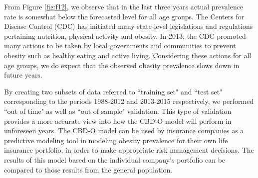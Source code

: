 \documentclass[11pt,letterpaper]{article}
\numberwithin{equation}{section}
\begin{document}
From Figure \ref{fig:f12}, we observe that in the last three years actual prevalence rate is somewhat below the forecasted level for all age groups. The Centers for Disease Control (CDC) has initiated many state-level legislations and regulations pertaining nutrition, physical activity and obesity. In 2013, the CDC promoted many actions to be taken by local governments and communities to prevent obesity such as healthy eating and active living. Considering these actions for all age groups, we do expect that the observed obesity prevalence slows down in future years.

By creating two subsets of data referred to ``training set" and ``test set" corresponding to the periods 1988-2012 and 2013-2015 respectively, we performed ``out of time" as well as ``out of sample" validation. This type of validation provides a more accurate view into how the CBD-O model will perform in unforeseen years. The CBD-O model can be used by insurance companies as a predictive modeling tool in modeling obesity prevalence for their own life insurance portfolio, in order to make appropriate risk management decisions. The results of this model based on the individual company's portfolio can be compared to those results from the general population.

\end{document}
